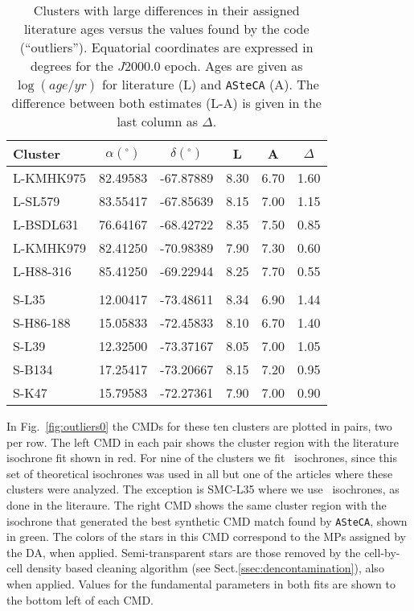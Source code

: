 \documentclass{aa}
\begin{document}
\begin{appendix}
\begin{table}
\centering
\caption{Clusters with large differences in their assigned literature ages
versus the values found by the code (``outliers'').
Equatorial coordinates are expressed in degrees for the $J2000.0$ epoch.
Ages are given as $\log(age/yr)$ for literature (L) and \texttt{ASteCA} (A).
The difference between both estimates (L-A) is given in the last column as
$\Delta$.}
\label{tab:outliers}
\begin{tabular}{lccccc}
\hline\hline
Cluster & $\alpha(^\circ)$ & $\delta(^\circ)$ & L & A & $\Delta$\\
\hline
L-KMHK975 & 82.49583 & -67.87889 & 8.30 & 6.70 & 1.60\\
L-SL579 & 83.55417 & -67.85639 & 8.15 & 7.00 & 1.15\\
L-BSDL631 & 76.64167 & -68.42722 & 8.35 & 7.50 & 0.85\\
L-KMHK979 & 82.41250 & -70.98389 & 7.90 & 7.30 & 0.60\\
L-H88-316 & 85.41250 & -69.22944 & 8.25 & 7.70 & 0.55\\
\\[-1.85ex]
S-L35 & 12.00417 & -73.48611 & 8.34 & 6.90 & 1.44\\
S-H86-188 & 15.05833 & -72.45833 & 8.10 & 6.70 & 1.40\\
S-L39 & 12.32500 & -73.37167 & 8.05 & 7.00 & 1.05\\
S-B134 & 17.25417 & -73.20667 & 8.15 & 7.20 & 0.95\\
S-K47 & 15.79583 & -72.27361 & 7.90 & 7.00 & 0.90\\
\hline
\end{tabular}
\end{table}

In Fig.~\ref{fig:outliers0} the CMDs for these ten clusters are plotted in
pairs, two per row.
The left CMD in each pair shows the cluster region with the literature isochrone
fit shown in red. For nine of the clusters we fit~\cite{Marigo_2008} isochrones,
since this set of theoretical isochrones was used in all but one of the
articles where these clusters were analyzed. The exception is SMC-L35 where we
use~\cite{Girardi_2002} isochrones, as done in the literaure.
%
The right CMD shows the same cluster region with the isochrone that generated
the best synthetic CMD match found by \texttt{ASteCA}, shown in green.
The colors of the stars in this CMD correspond to the MPs assigned by the DA,
when applied.
Semi-transparent stars are those removed by the cell-by-cell density based
cleaning algorithm (see Sect.\ref{ssec:dencontamination}), also when applied.
%
Values for the fundamental parameters in both fits are shown to the bottom left
of each CMD.\@


\end{appendix}
\end{document}
